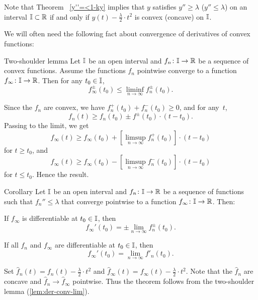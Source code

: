 Note that Theorem ~\ref{y''=<1-ky} implies that $y$ satisfies $y''\ge \lambda$ ($y''\le \lambda$)  on an interval $\II\subset\RR$  if and only if $y(t)-\frac{\lambda}{2}\cdot t^2$ is convex (concave) on $\mathbb{I}$.

We will often need the following fact about convergence of derivatives of convex functions:

{\sloppy 

\begin{thm}{Two-shoulder lemma}\label{lem:der-conv-lim}
Let $\mathbb{I}$ be an open interval 
and $f_n\:\II\to\RR$ be a sequence of 
convex functions. 
Assume the functions $f_n$ pointwise converge to a function $f_\infty\:\II\to\RR$.
Then for any $t_0\in \II$,
\[f_\infty^\pm(t_0)\le \liminf_{n\to\infty}f^\pm_n(t_0).\]
\end{thm}

}

Since the $f_n$ are convex, we have $f^+_n(t_0)+f^-_n(t_0)\ge0$, and for any~$t$,
\[f_n(t)\ge f_n(t_0)\pm f^\pm(t_0)\cdot (t-t_0).\]
Passing to the limit, we get
\[f_\infty(t)\ge f_\infty(t_0)+\left[\limsup_{n\to\infty}f^+_n(t_0)\right]\cdot (t-t_0)\]
for $t\ge t_0$, and 
\[f_\infty(t)\ge f_\infty(t_0)-\left[\limsup_{n\to\infty}f^-_n(t_0)\right]\cdot (t-t_0)\]
for $t\le t_0$.
Hence the result.
\qeds

\begin{thm}{Corollary}
\label{cor:der-conv-lim}
Let $\mathbb{I}$ be an open interval 
and $f_n\:\II\to\RR$ be a sequence of functions such that $f_n''\le \lambda$ that converge pointwise to a function $f_\infty\:\II\to\RR$.
Then: 
\begin{subthm}{} If $f_\infty$ is differentiable at $t_0\in \II$, then
\[f_\infty'(t_0)=\pm\lim_{n\to\infty} f^\pm_n(t_0).\]
\end{subthm}

\begin{subthm}{} If all $f_n$ and $f_\infty$ are differentiable at $t_0\in \II$, then
\[f_\infty'(t_0)=\lim_{n\to\infty} f'_n(t_0).\]
\end{subthm}
\end{thm}

 Set $\hat f_n(t)=f_n(t)-\tfrac{\lambda}{2}\cdot t^2$ and $\hat f_\infty(t)=f_\infty(t)-\tfrac\lambda2\cdot t^2$.
Note that the $\hat f_n$ are concave and $\hat f_n\to \hat f_\infty$ pointwise.
Thus the theorem follows from the two-shoulder lemma (\ref{lem:der-conv-lim}).\qeds











